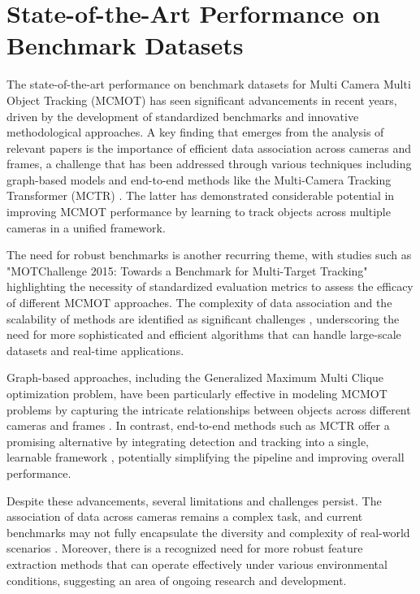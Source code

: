 \documentclass[conference]{IEEEtran}
\begin{document}
\section{State-of-the-Art Performance on Benchmark Datasets}
The state-of-the-art performance on benchmark datasets for Multi Camera Multi Object Tracking (MCMOT) has seen significant advancements in recent years, driven by the development of standardized benchmarks \cite{Tracking the Trackers: An Analysis of the State of the Art in Multiple Object Tracking} and innovative methodological approaches. A key finding that emerges from the analysis of relevant papers is the importance of efficient data association across cameras and frames, a challenge that has been addressed through various techniques including graph-based models \cite{Multi-camera Multi-Object Tracking} and end-to-end methods like the Multi-Camera Tracking Transformer (MCTR) \cite{MCTR: Multi Camera Tracking Transformer}. The latter has demonstrated considerable potential in improving MCMOT performance by learning to track objects across multiple cameras in a unified framework.

The need for robust benchmarks is another recurring theme, with studies such as "MOTChallenge 2015: Towards a Benchmark for Multi-Target Tracking" highlighting the necessity of standardized evaluation metrics to assess the efficacy of different MCMOT approaches. The complexity of data association and the scalability of methods are identified as significant challenges \cite{An equalised global graphical model-based approach for multi-camera object tracking}, underscoring the need for more sophisticated and efficient algorithms that can handle large-scale datasets and real-time applications.

Graph-based approaches, including the Generalized Maximum Multi Clique optimization problem, have been particularly effective in modeling MCMOT problems by capturing the intricate relationships between objects across different cameras and frames \cite{Multi-camera Multi-Object Tracking}. In contrast, end-to-end methods such as MCTR offer a promising alternative by integrating detection and tracking into a single, learnable framework \cite{MCTR: Multi Camera Tracking Transformer}, potentially simplifying the pipeline and improving overall performance.

Despite these advancements, several limitations and challenges persist. The association of data across cameras remains a complex task, and current benchmarks may not fully encapsulate the diversity and complexity of real-world scenarios \cite{Tracking the Trackers: An Analysis of the State of the Art in Multiple Object Tracking}. Moreover, there is a recognized need for more robust feature extraction methods that can operate effectively under various environmental conditions, suggesting an area of ongoing research and development.
\end{document}
